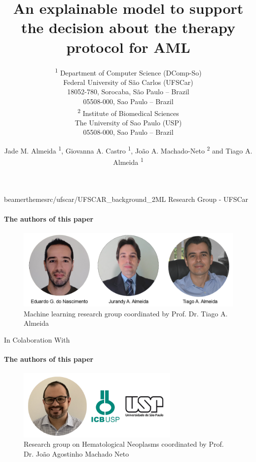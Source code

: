 \documentclass{beamer}
\title{An explainable model to support the decision about the  therapy protocol for AML}
\author{\small Jade M. Almeida \textsuperscript{1},
Giovanna A. Castro \textsuperscript{1}, 
João A. Machado-Neto \textsuperscript{2} and Tiago A. Almeida \textsuperscript{1}}
\date{}
\subtitle{
\vspace{0.25cm}
\textsuperscript{1}
Department of Computer Science (DComp-So)\\
Federal University of São Carlos (UFSCar)\\
18052-780, Sorocaba, São  Paulo -- Brazil\\
05508-000, Sao Paulo -- Brazil\\
\vspace{0.25cm}
\textsuperscript{2} 
Institute of Biomedical Sciences\\
The University of Sao Paulo (USP)\\
05508-000, Sao  Paulo -- Brazil\\
}
\begin{document}
\maketitle




\begin{sidepic}{beamerthemesrc/ufscar/UFSCAR_background_2}{ML Research Group - UFSCar}
\framesubtitle{The authors of this paper}

\begin{center}
    
\begin{figure}
    \centering
    \includegraphics[width=\textwidth]{beamerthemesrc/authors/profile_authors.png}
    \caption{\tiny Machine learning research group coordinated by Prof. Dr. Tiago A. Almeida} %
    \label{fig:authors}
\end{figure}
\end{center}
    
\end{sidepic}


\begin{frame}{In Colaboration With}
\framesubtitle{The authors of this paper}

\begin{figure}
    \centering
    \includegraphics[width=0.7\textwidth]{beamerthemesrc/authors/profile_joao.png}
    \caption{Research group on Hematological Neoplasms coordinated by Prof. Dr. João Agostinho Machado Neto} %
    \label{fig:colaboration}
\end{figure}
    
\end{frame}
\end{document}
